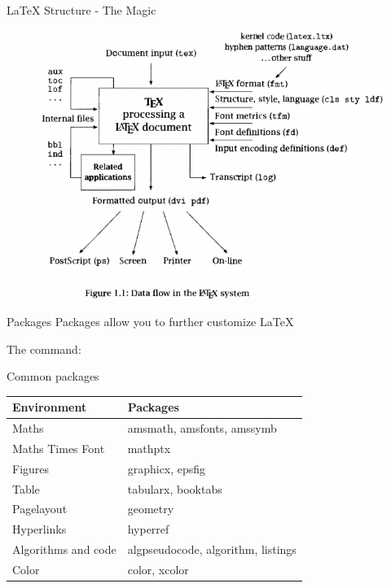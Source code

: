 \documentclass[10pt,times]{beamer}
\begin{document}
\begin{frame}{LaTeX Structure - The Magic}
\begin{figure}
\centering
\includegraphics[height=0.95\textheight]{figs/LaTeX.png}
\end{figure}
\end{frame}



\begin{frame}{Packages}
Packages allow you to further customize \LaTeX
\begin{block}{The command:}
\end{block}

\begin{block}{Common packages}
\begin{tabularx}{0.95\textwidth}{lX}
\toprule
Environment & Packages \\ \midrule
Maths & amsmath, amsfonts, amssymb \\ 
Maths Times Font & {mathptx} \\
Figures & graphicx, epsfig \\
Table & tabularx, booktabs \\
Pagelayout & geometry \\
Hyperlinks & hyperref \\
Algorithms and code & algpseudocode, algorithm, listings \\
Color & color, xcolor \\
\bottomrule
\end{tabularx}
\end{block}
\end{frame}
\end{document}
